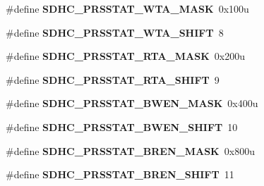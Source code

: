 \begin{DoxyCompactItemize}
\item 
\#define {\bfseries S\+D\+H\+C\+\_\+\+P\+R\+S\+S\+T\+A\+T\+\_\+\+W\+T\+A\+\_\+\+M\+A\+SK}~0x100u\hypertarget{group__SDHC__Register__Masks_gae6ab1f30d29da8d10ad0985318d09c30}{}\label{group__SDHC__Register__Masks_gae6ab1f30d29da8d10ad0985318d09c30}

\item 
\#define {\bfseries S\+D\+H\+C\+\_\+\+P\+R\+S\+S\+T\+A\+T\+\_\+\+W\+T\+A\+\_\+\+S\+H\+I\+FT}~8\hypertarget{group__SDHC__Register__Masks_ga52a878b9915b1b1dd257b24abb21a33f}{}\label{group__SDHC__Register__Masks_ga52a878b9915b1b1dd257b24abb21a33f}

\item 
\#define {\bfseries S\+D\+H\+C\+\_\+\+P\+R\+S\+S\+T\+A\+T\+\_\+\+R\+T\+A\+\_\+\+M\+A\+SK}~0x200u\hypertarget{group__SDHC__Register__Masks_gad374f3cdffc3be8138708bf632b303be}{}\label{group__SDHC__Register__Masks_gad374f3cdffc3be8138708bf632b303be}

\item 
\#define {\bfseries S\+D\+H\+C\+\_\+\+P\+R\+S\+S\+T\+A\+T\+\_\+\+R\+T\+A\+\_\+\+S\+H\+I\+FT}~9\hypertarget{group__SDHC__Register__Masks_gaad64c483eb2e6b6fc96cd466772b1af5}{}\label{group__SDHC__Register__Masks_gaad64c483eb2e6b6fc96cd466772b1af5}

\item 
\#define {\bfseries S\+D\+H\+C\+\_\+\+P\+R\+S\+S\+T\+A\+T\+\_\+\+B\+W\+E\+N\+\_\+\+M\+A\+SK}~0x400u\hypertarget{group__SDHC__Register__Masks_ga59c9cd5ee08a703b51a4487e721cfdac}{}\label{group__SDHC__Register__Masks_ga59c9cd5ee08a703b51a4487e721cfdac}

\item 
\#define {\bfseries S\+D\+H\+C\+\_\+\+P\+R\+S\+S\+T\+A\+T\+\_\+\+B\+W\+E\+N\+\_\+\+S\+H\+I\+FT}~10\hypertarget{group__SDHC__Register__Masks_ga2a8af22b9f8230f46db9118a7f4a2f62}{}\label{group__SDHC__Register__Masks_ga2a8af22b9f8230f46db9118a7f4a2f62}

\item 
\#define {\bfseries S\+D\+H\+C\+\_\+\+P\+R\+S\+S\+T\+A\+T\+\_\+\+B\+R\+E\+N\+\_\+\+M\+A\+SK}~0x800u\hypertarget{group__SDHC__Register__Masks_ga9a1a3466ff4e6ec9067956296e917ebf}{}\label{group__SDHC__Register__Masks_ga9a1a3466ff4e6ec9067956296e917ebf}

\item 
\#define {\bfseries S\+D\+H\+C\+\_\+\+P\+R\+S\+S\+T\+A\+T\+\_\+\+B\+R\+E\+N\+\_\+\+S\+H\+I\+FT}~11\hypertarget{group__SDHC__Register__Masks_ga755afbadcc686b9a04f531081c5fb811}{}\label{group__SDHC__Register__Masks_ga755afbadcc686b9a04f531081c5fb811}


\end{DoxyCompactItemize}
